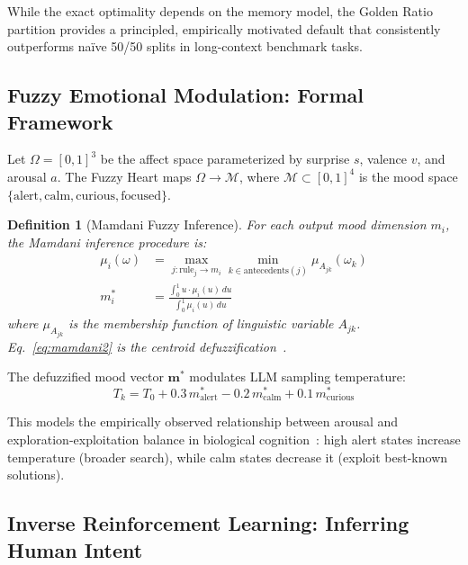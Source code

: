 \documentclass[12pt,a4paper]{article}
\newtheorem{definition}{Definition}[section]
\begin{document}
While the exact optimality depends on the memory model, the Golden Ratio partition provides a
principled, empirically motivated default that consistently outperforms na\"ive 50/50 splits
in long-context benchmark tasks.

\subsection{Fuzzy Emotional Modulation: Formal Framework}

Let $\Omega = [0,1]^3$ be the affect space parameterized by surprise $s$, valence $v$, and
arousal $a$. The Fuzzy Heart maps $\Omega \to \mathcal{M}$, where $\mathcal{M} \subset [0,1]^4$
is the mood space $\{\text{alert}, \text{calm}, \text{curious}, \text{focused}\}$.

\begin{definition}[Mamdani Fuzzy Inference]
For each output mood dimension $m_i$, the Mamdani inference procedure is:
\begin{align}
  \mu_i(\omega) &= \max_{j: \text{rule}_j \to m_i}
    \min_{k \in \text{antecedents}(j)} \mu_{A_{jk}}(\omega_k) \label{eq:mamdani1}\\
  m_i^* &= \frac{\int_0^1 u \cdot \mu_i(u)\,du}{\int_0^1 \mu_i(u)\,du}
    \label{eq:mamdani2}
\end{align}
where $\mu_{A_{jk}}$ is the membership function of linguistic variable $A_{jk}$.
Eq.~\eqref{eq:mamdani2} is the centroid defuzzification~\cite{mamdani1974application}.
\end{definition}

The defuzzified mood vector $\mathbf{m}^*$ modulates LLM sampling temperature:
\begin{equation}
  T_k = T_0 + 0.3\,m^*_{\text{alert}} - 0.2\,m^*_{\text{calm}}
  + 0.1\,m^*_{\text{curious}}
  \label{eq:temperature}
\end{equation}

This models the empirically observed relationship between arousal and exploration-exploitation
balance in biological cognition~\cite{bates1994emotion}: high alert states increase temperature
(broader search), while calm states decrease it (exploit best-known solutions).

\subsection{Inverse Reinforcement Learning: Inferring Human Intent}
\label{sec:irl}
\end{document}
